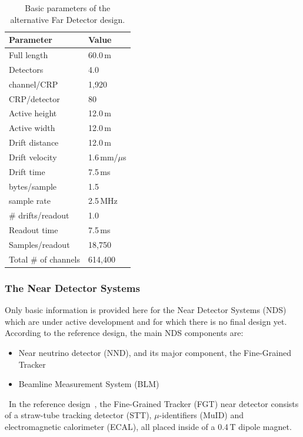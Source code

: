 \begin{table}[ht!]
	\centering
	\begin{tabular}{| p{2.5in} | p{1in} |}
		\hline
		\textbf{Parameter} & \textbf{Value} \\ \hline

Full length & 60.0\,m \\ \hline
Detectors & 4.0 \\ \hline
channel/CRP & 1,920 \\ \hline
CRP/detector & 80 \\ \hline
Active height & 12.0\,m \\ \hline
Active width  & 12.0\,m \\ \hline
Drift distance & 12.0\,m \\ \hline
Drift velocity & 1.6\,mm/$\mu$s \\ \hline
Drift time & 7.5\,ms \\ \hline
bytes/sample & 1.5 \\ \hline
sample rate & 2.5\,MHz \\ \hline
\# drifts/readout & 1.0 \\ \hline
Readout time & 7.5\,ms \\ \hline
Samples/readout & 18,750 \\ \hline
Total \# of channels & 614,400  \\ \hline
	\end{tabular}
	\caption{Basic parameters of the alternative Far Detector design.}
	\label{tab:alt-fundamental-parameters}
\end{table}

\subsubsection{The Near Detector Systems}
\label{sec:nds-params}
Only basic information is provided here for the Near Detector Systems (NDS) which are under active development
and for which there is no final design yet. According to the reference design, the main NDS components are:
\begin{itemize}
\item Near neutrino detector (NND), and its major component, the Fine-Grained Tracker
\item Beamline Measurement System (BLM)
\end{itemize}
\ 
In the reference design~\cite{cdr_vol4_docdb}, the Fine-Grained Tracker (FGT) near detector consists of a straw-tube
tracking detector (STT), $\mu$-identifiers (MuID) and electromagnetic calorimeter (ECAL), all placed inside of a 0.4\,T dipole magnet.

